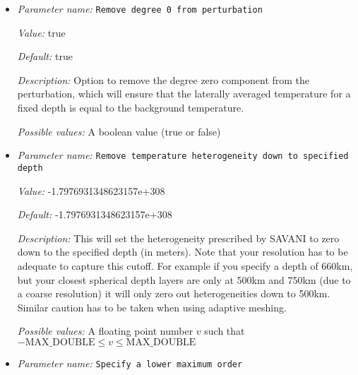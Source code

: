 \begin{itemize}
{\it Value:} 1600.0


{\it Default:} 1600.0


{\it Description:} The reference temperature that is perturbed by the spherical harmonic functions. Only used in incompressible models.


{\it Possible values:} A floating point number $v$ such that $0 \leq v \leq \text{MAX\_DOUBLE}$
\item {\it Parameter name:} {\tt Remove degree 0 from perturbation}
\label{parameters:Initial temperature model/SAVANI perturbation/Remove degree 0 from perturbation}


{\it Value:} true


{\it Default:} true


{\it Description:} Option to remove the degree zero component from the perturbation, which will ensure that the laterally averaged temperature for a fixed depth is equal to the background temperature.


{\it Possible values:} A boolean value (true or false)
\item {\it Parameter name:} {\tt Remove temperature heterogeneity down to specified depth}
\label{parameters:Initial temperature model/SAVANI perturbation/Remove temperature heterogeneity down to specified depth}


{\it Value:} -1.7976931348623157e+308


{\it Default:} -1.7976931348623157e+308


{\it Description:} This will set the heterogeneity prescribed by SAVANI to zero down to the specified depth (in meters). Note that your resolution has to be adequate to capture this cutoff. For example if you specify a depth of 660km, but your closest spherical depth layers are only at 500km and 750km (due to a coarse resolution) it will only zero out heterogeneities down to 500km. Similar caution has to be taken when using adaptive meshing.


{\it Possible values:} A floating point number $v$ such that $-\text{MAX\_DOUBLE} \leq v \leq \text{MAX\_DOUBLE}$
\item {\it Parameter name:} {\tt Specify a lower maximum order}
\label{parameters:Initial temperature model/SAVANI perturbation/Specify a lower maximum order}



\end{itemize}
